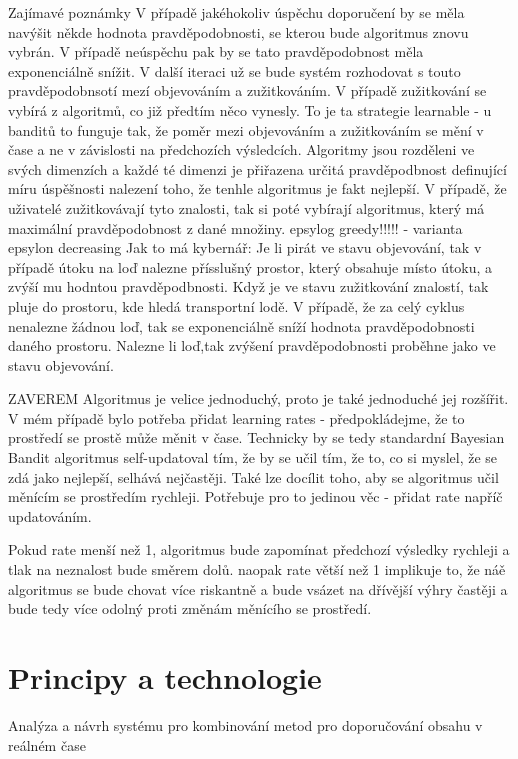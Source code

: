 \documentclass[thesis=M,czech]{FITthesis}[2014/05/07]
\begin{document}
Zajímavé poznámky
V případě jakéhokoliv úspěchu doporučení by se měla navýšit někde hodnota pravděpodobnosti, se kterou bude algoritmus znovu vybrán. V případě neúspěchu pak by se tato pravděpodobnost měla exponenciálně snížit. V další iteraci už se bude systém rozhodovat s touto pravděpodobnsotí mezí objevováním a zužitkováním. V případě zužitkování se vybírá z algoritmů, co již předtím něco vynesly. To je ta strategie learnable - u banditů to funguje tak, že poměr mezi objevováním a zužitkováním se mění v čase a ne v závislosti na předchozích výsledcích. Algoritmy jsou rozděleni ve svých dimenzích a každé té dimenzi je přiřazena určitá pravděpodbnost definující míru úspěšnosti nalezení toho, že tenhle algoritmus je fakt nejlepší. V případě, že uživatelé zužitkovávají tyto znalosti, tak si poté vybírají algoritmus, který má maximální pravděpodobnost z dané množiny. 
epsylog greedy!!!!! - varianta  epsylon decreasing
Jak to má kybernář: Je li pirát ve stavu objevování, tak v případě útoku na loď nalezne přísslušný prostor, který obsahuje místo útoku, a zvýší mu hodntou pravděpodbnosti. Když je ve stavu zužitkování znalostí, tak pluje do prostoru, kde hledá transportní lodě. V případě, že za celý cyklus nenalezne žádnou loď, tak se exponenciálně sníží hodnota pravděpodobnosti daného prostoru. Nalezne li loď,tak zvýšení pravděpodobnosti proběhne jako ve stavu objevování. 


ZAVEREM
Algoritmus je velice jednoduchý, proto je také jednoduché jej rozšířit. V mém případě bylo potřeba přidat learning rates - předpokládejme, že to prostředí se prostě může měnit v čase. Technicky by se tedy standardní Bayesian Bandit algoritmus self-updatoval tím, že by se učil tím, že to, co si myslel, že se zdá jako nejlepší, selhává nejčastěji. Také lze docílit toho, aby se algoritmus učil měnícím se prostředím rychleji. Potřebuje pro to jedinou věc - přidat rate napříč updatováním.

Pokud rate menší než 1, algoritmus bude zapomínat předchozí výsledky rychleji a tlak na neznalost bude směrem dolů. naopak rate větší než 1 implikuje to, že náě algoritmus se bude chovat více riskantně a bude vsázet na dřívější výhry častěji a bude tedy více odolný proti změnám měnícího se prostředí.
		
\chapter{Principy a technologie}
\label{chap:sysanalys}
Analýza a návrh systému pro kombinování metod pro doporučování obsahu v reálném čase
\end{document}
